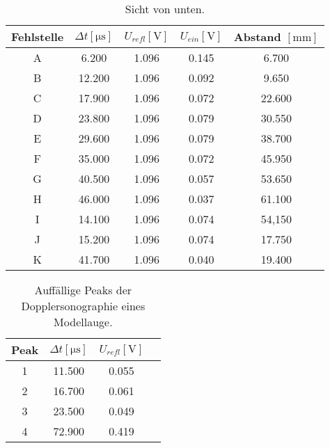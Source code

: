 \begin{table}
    \centering
    \caption{Sicht von unten.}
    \label{tab:2}
    \begin{tabular}{c | c c c c}
        \toprule
        Fehlstelle & $\Delta t [\si{\micro\second}] $ &  $U_{refl} [\si{\volt}]$ & $U_{ein}[\si{\volt}]$ & Abstand $[\si{\milli\meter}]$ \\
        \midrule
        A &    6.200    &   1.096   &    0.145    &    6.700    \\
        B &   12.200    &   1.096   &    0.092    &    9.650    \\
        C &   17.900    &   1.096   &    0.072    &   22.600    \\
        D &   23.800    &   1.096   &    0.079    &   30.550    \\
        E &   29.600    &   1.096   &    0.079    &   38.700    \\
        F &   35.000    &   1.096   &    0.072    &   45.950    \\
        G &   40.500    &   1.096   &    0.057    &   53.650    \\
        H &   46.000    &   1.096   &    0.037    &   61.100    \\
        I &   14.100    &   1.096   &    0.074    &   54,150    \\
        J &   15.200    &   1.096   &    0.074    &   17.750    \\
        K &   41.700    &   1.096   &    0.040    &   19.400    \\
    \end{tabular}
\end{table}


\begin{table}
    \centering
    \caption{Auffällige Peaks der Dopplersonographie eines Modellauge.}
    \label{tab:2}
    \begin{tabular}{c | c c c}
        \toprule
        Peak & $\Delta t [\si{\micro\second}] $ & $U_{refl} [\si{\volt}]$ \\
        \midrule
        1  &11.500&0.055 \\
        2  &16.700&0.061 \\
        3  &23.500&0.049 \\
        4  &72.900&0.419 \\       
    \end{tabular}
\end{table}
